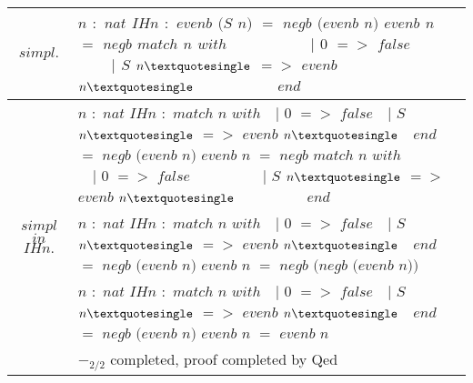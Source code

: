 \begin{longtable}{| S | P |}
	\hline
	 & $n$$ $ $ : $ $ nat$\linebreak
	$IHn$$ $ $ : $ $ evenb $ $ (S $ $ n) $ $ = $ $ negb $ $ (evenb $ $ n)$\linebreak
	\fracrule\linebreak
	$evenb $ $ n $ $ = $ $ negb $ $ match $ $ n $ $ with
	$ $  $ $  $ $  $ $  $ $  $ $  $ $  $ $  $ $  $ $  $ $  $ $  $ $  $ $  $ $ | $ $ 0 $ $ ={>} $ $ false
	$ $  $ $  $ $  $ $  $ $  $ $  $ $  $ $  $ $  $ $  $ $  $ $  $ $  $ $  $ $ | $ $ S $ $ n{\textquotesingle} $ $ ={>} $ $ evenb $ $ n{\textquotesingle}
	$ $  $ $  $ $  $ $  $ $  $ $  $ $  $ $  $ $  $ $  $ $  $ $  $ $  $ $  $ $ end$\\
	
	\hline
	 & $n$$ $ $ : $ $ nat$\linebreak
	$IHn$$ $ $ : $ $ match $ $ n $ $ with
	$ $  $ $  $ $ | $ $ 0 $ $ ={>} $ $ false
	$ $  $ $  $ $ | $ $ S $ $ n{\textquotesingle} $ $ ={>} $ $ evenb $ $ n{\textquotesingle}
	$ $  $ $  $ $ end $ $ = $ $ negb $ $ (evenb $ $ n)$\linebreak
	\fracrule\linebreak
	$evenb $ $ n $ $ = $ $ negb $ $ match $ $ n $ $ with
	$ $  $ $  $ $  $ $  $ $  $ $  $ $  $ $  $ $  $ $  $ $  $ $  $ $  $ $  $ $ | $ $ 0 $ $ ={>} $ $ false
	$ $  $ $  $ $  $ $  $ $  $ $  $ $  $ $  $ $  $ $  $ $  $ $  $ $  $ $  $ $ | $ $ S $ $ n{\textquotesingle} $ $ ={>} $ $ evenb $ $ n{\textquotesingle}
	$ $  $ $  $ $  $ $  $ $  $ $  $ $  $ $  $ $  $ $  $ $  $ $  $ $  $ $  $ $ end$\\
	
	\hline
	 & $n$$ $ $ : $ $ nat$\linebreak
	$IHn$$ $ $ : $ $ match $ $ n $ $ with
	$ $  $ $  $ $ | $ $ 0 $ $ ={>} $ $ false
	$ $  $ $  $ $ | $ $ S $ $ n{\textquotesingle} $ $ ={>} $ $ evenb $ $ n{\textquotesingle}
	$ $  $ $  $ $ end $ $ = $ $ negb $ $ (evenb $ $ n)$\linebreak
	\fracrule\linebreak
	$evenb $ $ n $ $ = $ $ negb $ $ (negb $ $ (evenb $ $ n))$\\
	
	\hline
	 & $n$$ $ $ : $ $ nat$\linebreak
	$IHn$$ $ $ : $ $ match $ $ n $ $ with
	$ $  $ $  $ $ | $ $ 0 $ $ ={>} $ $ false
	$ $  $ $  $ $ | $ $ S $ $ n{\textquotesingle} $ $ ={>} $ $ evenb $ $ n{\textquotesingle}
	$ $  $ $  $ $ end $ $ = $ $ negb $ $ (evenb $ $ n)$\linebreak
	\fracrule\linebreak
	$evenb $ $ n $ $ = $ $ evenb $ $ n$\\
	
	\hline
	$reflexivity.$ & $-_{2/2}$ completed, proof completed by Qed \label{Proofs:coq-example:Theorem:evenb-S} \\
	\hline
\end{longtable}

